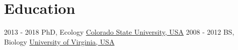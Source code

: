 \documentclass[letterpaper]{twentysecondcv} %
\begin{document}
\makeprofile %

\section{Education}

\begin{twenty} %
	\twentyitem
    	{2013 - 2018}
        {}
        {PhD, Ecology}
        {\href{http://www.colostate.edu/}{Colorado State University, USA}}
        {}
        {}
	\twentyitem
    	{2008 - 2012}
		{}
        {BS, Biology}
        {\href{http://www.virginia.edu/}{University of Virginia, USA}}
        {}
        {}
\end{twenty}


\end{document}
